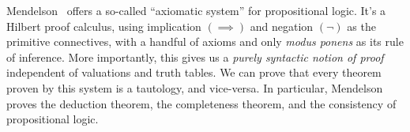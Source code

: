 \begin{node}\label{prop-000F}%
Mendelson~\cite[\S1.4]{mendelson2015mathematical} offers a so-called
``axiomatic system'' for propositional logic. It's a Hilbert proof
calculus, using implication $(\implies)$ and negation $(\neg)$ as the
primitive connectives, with a handful of axioms and only
\textit{modus ponens} as its rule of inference. More importantly, this
gives us a \emph{purely syntactic notion of proof} independent of
valuations and truth tables. We can prove that every theorem proven
by this system is a tautology, and vice-versa. In particular, Mendelson
proves the deduction theorem, the completeness theorem, and the consistency of
propositional logic.
\end{node}
